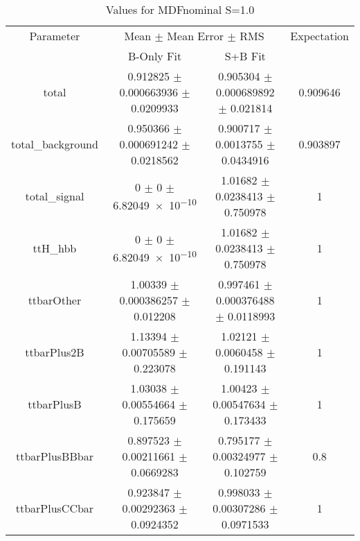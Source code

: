 \begin{table}
\centering
\caption{Values for MDFnominal S=1.0}
\begin{tabular}{cccc}
\toprule
Parameter & \multicolumn{2}{c}{Mean $\pm$ Mean Error $\pm$ RMS} & Expectation\\
 & B-Only Fit & S+B Fit & \\
\midrule
total & \num{0.912825} $\pm$ \num{0.000663936} $\pm$ \num{0.0209933} & \num{0.905304} $\pm$ \num{0.000689892} $\pm$ \num{0.021814} & \num{0.909646}\\
total\_background & \num{0.950366} $\pm$ \num{0.000691242} $\pm$ \num{0.0218562} & \num{0.900717} $\pm$ \num{0.0013755} $\pm$ \num{0.0434916} & \num{0.903897}\\
total\_signal & \num{0} $\pm$ \num{0} $\pm$ \num{6.82049e-10} & \num{1.01682} $\pm$ \num{0.0238413} $\pm$ \num{0.750978} & \num{1}\\
ttH\_hbb & \num{0} $\pm$ \num{0} $\pm$ \num{6.82049e-10} & \num{1.01682} $\pm$ \num{0.0238413} $\pm$ \num{0.750978} & \num{1}\\
ttbarOther & \num{1.00339} $\pm$ \num{0.000386257} $\pm$ \num{0.012208} & \num{0.997461} $\pm$ \num{0.000376488} $\pm$ \num{0.0118993} & \num{1}\\
ttbarPlus2B & \num{1.13394} $\pm$ \num{0.00705589} $\pm$ \num{0.223078} & \num{1.02121} $\pm$ \num{0.0060458} $\pm$ \num{0.191143} & \num{1}\\
ttbarPlusB & \num{1.03038} $\pm$ \num{0.00554664} $\pm$ \num{0.175659} & \num{1.00423} $\pm$ \num{0.00547634} $\pm$ \num{0.173433} & \num{1}\\
ttbarPlusBBbar & \num{0.897523} $\pm$ \num{0.00211661} $\pm$ \num{0.0669283} & \num{0.795177} $\pm$ \num{0.00324977} $\pm$ \num{0.102759} & \num{0.8}\\
ttbarPlusCCbar & \num{0.923847} $\pm$ \num{0.00292363} $\pm$ \num{0.0924352} & \num{0.998033} $\pm$ \num{0.00307286} $\pm$ \num{0.0971533} & \num{1}\\
\bottomrule
\end{tabular}
\end{table}